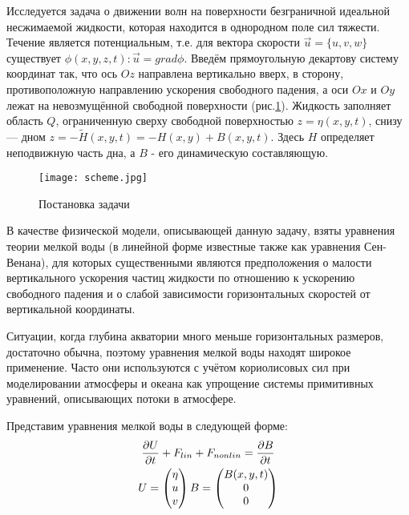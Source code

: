 Исследуется задача о движении волн на поверхности безграничной идеальной несжимаемой жидкости, которая находится в однородном поле сил тяжести. Течение является потенциальным, т.е. для вектора скорости $\vec{u}=\{u,v,w\}$ существует $\phi(x,y,z,t):\vec{u}=grad \phi$. Введём прямоугольную декартову систему координат так, что ось $Oz$ направлена вертикально вверх, в сторону, противоположную направлению ускорения свободного падения, а оси $Ox$ и $Oy$ лежат на невозмущённой свободной поверхности (рис.\;\ref{figure:schema}). Жидкость заполняет область $Q$, ограниченную сверху свободной поверхностью $z=\eta(x,y,t)$, снизу — дном $z=-\tilde{H}(x,y,t)=-H(x,y)+B(x,y,t)$. Здесь $H$ определяет неподвижную часть дна, а $B$ - его динамическую составляющую.

\begin{figure}[htp]
    \centering
    \texttt{[image: scheme.jpg]}
    \caption{Постановка задачи}
    \label{figure:schema}
\end{figure}

В качестве физической модели, описывающей данную задачу, взяты уравнения теории мелкой воды (в линейной форме известные также как уравнения Сен-Венана), для которых существенными являются предположения о малости вертикального ускорения частиц жидкости по отношению к ускорению свободного падения и о слабой зависимости горизонтальных скоростей от вертикальной координаты.

Ситуации, когда глубина акватории много меньше горизонтальных размеров, достаточно обычна, поэтому уравнения мелкой воды находят широкое применение. Часто они используются с учётом кориолисовых сил при моделировании атмосферы и океана как упрощение системы примитивных уравнений, описывающих потоки в атмосфере.

Представим уравнения мелкой воды в следующей форме:
\begin{gather}
    \label{eq:MainVectorForm}
    \frac{\partial U}{\partial t}+F_{lin}+F_{nonlin}=\frac{\partial B}{\partial t}\\
    \label{eq:UB}
    U=\begin{pmatrix}\eta\\u\\v\end{pmatrix}
    B=\begin{pmatrix}B(x,y,t)\\0\\0\end{pmatrix}\notag
\end{gather}

